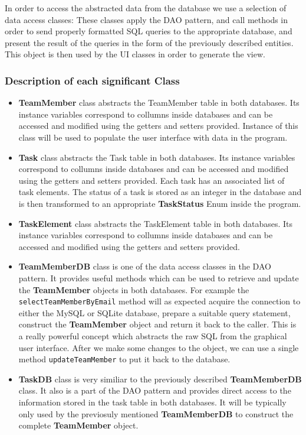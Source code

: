   In order to access the abstracted data from the database we use a selection of data access classes:
  These classes apply the DAO pattern, and call methods in order to send properly formatted SQL queries to the appropriate database, and present the result of the queries in the form of the previously described entities. 
  This object is then used by the UI classes in order to generate the view.

  \subsubsection{Description of each significant Class}

  \begin{itemize}
  		\item \textbf{TeamMember} class abstracts the TeamMember table in both databases. Its instance variables correspond to collumns inside 
  		databases and can be accessed and modified using the getters and setters provided. Instance of this class will be used to populate
  		the user interface with data in the program.
  		\item \textbf{Task} class abstracts the Task table in both databases. Its instance variables correspond to collumns inside 
  		databases and can be accessed and modified using the getters and setters provided. Each task has an associated list of task elements. The status of a task is stored as an integer in the database and is then transformed to an appropriate \textbf{TaskStatus} Enum inside the program.
  		\item \textbf{TaskElement} class abstracts the TaskElement table in both databases. Its instance variables correspond to collumns inside 
  		databases and can be accessed and modified using the getters and setters provided. 
  		\item \textbf{TeamMemberDB} class is one of the data access classes in the DAO pattern. It provides useful methods which can be used to retrieve and update the \textbf{TeamMember} objects in both databases. For example the \texttt{selectTeamMemberByEmail} method will as expected acquire the connection to either the MySQL or SQLite database, prepare a suitable query statement, construct the \textbf{TeamMember}
  		object and return it back to the caller. This is a really powerful concept which abstracts the raw SQL from the graphical user interface. After we make some changes to the object, we can use a single method \texttt{updateTeamMember} to put it back to the database. 
  		\item \textbf{TaskDB} class is very similiar to the previously described \textbf{TeamMemberDB} class. It also is a part of the DAO pattern and provides direct access to the information stored in the task table in both databases. It will be typically only used by the previosuly mentioned \textbf{TeamMemberDB} to construct the complete \textbf{TeamMember} object.

\end{itemize}

